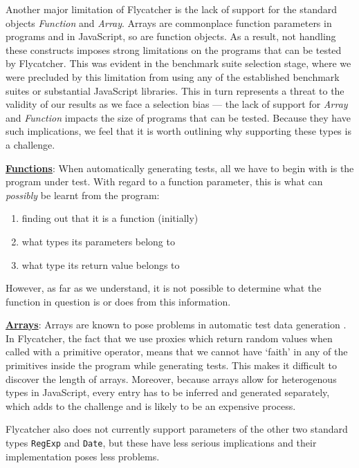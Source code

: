 Another major limitation of \textsf{Flycatcher} is the lack of support for the standard objects \textit{Function} and \textit{Array}. Arrays are commonplace function parameters in programs and in JavaScript, so are function objects. As a result, not handling these constructs imposes strong limitations on the programs that can be tested by \textsf{Flycatcher}. This was evident in the benchmark suite selection stage, where we were precluded by this limitation from using any of the established benchmark suites or substantial JavaScript libraries. This in turn represents a threat to the validity of our results as we face a selection bias --- the lack of support for \textit{Array} and \textit{Function} impacts the size of programs that can be tested. Because they have such implications, we feel that it is worth outlining why supporting these types is a challenge.

\textbf{\underline{Functions}}: When automatically generating tests, all we have to begin with is the program under test. With regard to a function parameter, this is what can \emph{possibly} be learnt from the program:

\begin{enumerate}
   \item finding out that it is a function (initially)
   \item what types its parameters belong to
   \item what type its return value belongs to
\end{enumerate}

However, as far as we understand, it is not possible to determine what the function in question is or does from this information.

\textbf{\underline{Arrays}}: Arrays are known to pose problems in automatic test data generation \cite{tahbildar2automated}. In \textsf{Flycatcher}, the fact that we use proxies which return random values when called with a primitive operator, means that we cannot have `faith' in any of the primitives inside the program while generating tests. This makes it difficult to discover the length of arrays. Moreover, because arrays allow for heterogenous types in JavaScript, every entry has to be inferred and generated separately, which adds to the challenge and is likely to be an expensive process.

\textsf{Flycatcher} also does not currently support parameters of the other two standard types \texttt{RegExp} and \texttt{Date}, but these have less serious implications and their implementation poses less problems.\\

